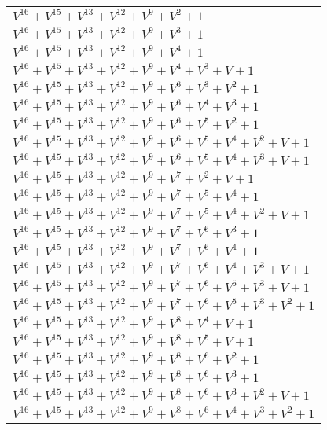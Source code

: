 \documentclass[12pt]{article}
\begin{document}
\begin{adjustwidth}{-4cm}{}
\begin{center}
\begin{longtable}{|l|}
$V^{16}  +V^{15}  +V^{13}  +V^{12}  +V^{9}  +V^{2}  + 1$ \\
$V^{16}  +V^{15}  +V^{13}  +V^{12}  +V^{9}  +V^{3}  + 1$ \\
$V^{16}  +V^{15}  +V^{13}  +V^{12}  +V^{9}  +V^{4}  + 1$ \\
$V^{16}  +V^{15}  +V^{13}  +V^{12}  +V^{9}  +V^{4}  +V^{3}  + V + 1$ \\
$V^{16}  +V^{15}  +V^{13}  +V^{12}  +V^{9}  +V^{6}  +V^{3}  +V^{2}  + 1$ \\
$V^{16}  +V^{15}  +V^{13}  +V^{12}  +V^{9}  +V^{6}  +V^{4}  +V^{3}  + 1$ \\
$V^{16}  +V^{15}  +V^{13}  +V^{12}  +V^{9}  +V^{6}  +V^{5}  +V^{2}  + 1$ \\
$V^{16}  +V^{15}  +V^{13}  +V^{12}  +V^{9}  +V^{6}  +V^{5}  +V^{4}  +V^{2}  + V + 1$ \\
$V^{16}  +V^{15}  +V^{13}  +V^{12}  +V^{9}  +V^{6}  +V^{5}  +V^{4}  +V^{3}  + V + 1$ \\
$V^{16}  +V^{15}  +V^{13}  +V^{12}  +V^{9}  +V^{7}  +V^{2}  + V + 1$ \\
$V^{16}  +V^{15}  +V^{13}  +V^{12}  +V^{9}  +V^{7}  +V^{5}  +V^{4}  + 1$ \\
$V^{16}  +V^{15}  +V^{13}  +V^{12}  +V^{9}  +V^{7}  +V^{5}  +V^{4}  +V^{2}  + V + 1$ \\
$V^{16}  +V^{15}  +V^{13}  +V^{12}  +V^{9}  +V^{7}  +V^{6}  +V^{3}  + 1$ \\
$V^{16}  +V^{15}  +V^{13}  +V^{12}  +V^{9}  +V^{7}  +V^{6}  +V^{4}  + 1$ \\
$V^{16}  +V^{15}  +V^{13}  +V^{12}  +V^{9}  +V^{7}  +V^{6}  +V^{4}  +V^{3}  + V + 1$ \\
$V^{16}  +V^{15}  +V^{13}  +V^{12}  +V^{9}  +V^{7}  +V^{6}  +V^{5}  +V^{3}  + V + 1$ \\
$V^{16}  +V^{15}  +V^{13}  +V^{12}  +V^{9}  +V^{7}  +V^{6}  +V^{5}  +V^{3}  +V^{2}  + 1$ \\
$V^{16}  +V^{15}  +V^{13}  +V^{12}  +V^{9}  +V^{8}  +V^{4}  + V + 1$ \\
$V^{16}  +V^{15}  +V^{13}  +V^{12}  +V^{9}  +V^{8}  +V^{5}  + V + 1$ \\
$V^{16}  +V^{15}  +V^{13}  +V^{12}  +V^{9}  +V^{8}  +V^{6}  +V^{2}  + 1$ \\
$V^{16}  +V^{15}  +V^{13}  +V^{12}  +V^{9}  +V^{8}  +V^{6}  +V^{3}  + 1$ \\
$V^{16}  +V^{15}  +V^{13}  +V^{12}  +V^{9}  +V^{8}  +V^{6}  +V^{3}  +V^{2}  + V + 1$ \\
$V^{16}  +V^{15}  +V^{13}  +V^{12}  +V^{9}  +V^{8}  +V^{6}  +V^{4}  +V^{3}  +V^{2}  + 1$ \\

\end{longtable}
\end{center}
\end{adjustwidth}
\end{document}
